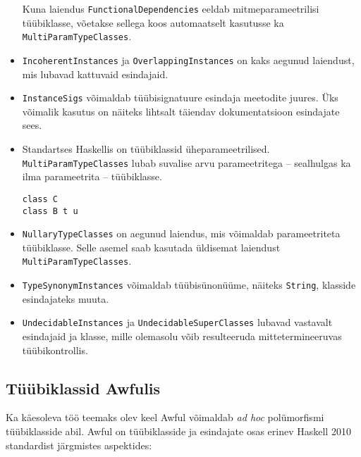 \documentclass[12pt]{article}
\begin{document}
\begin{itemize}
            Kuna laiendus \verb!FunctionalDependencies! eeldab mitmeparameetrilisi tüübiklasse, võetakse sellega koos automaatselt kasutusse ka \verb!MultiParamTypeClasses!.
          \item
            \verb!IncoherentInstances! ja \verb!OverlappingInstances! on kaks aegunud laiendust, mis lubavad kattuvaid esindajaid.
          \item
            \verb!InstanceSigs! võimaldab tüübisignatuure esindaja meetodite juures. Üks võimalik kasutus on näiteks lihtsalt täiendav dokumentatsioon esindajate sees.
          \item
            Standartses Haskellis on tüübiklassid üheparameetrilised. \verb!MultiParamTypeClasses! lubab suvalise arvu parameetritega -- sealhulgas ka ilma parameetrita -- tüübiklasse.

            \begin{verbatim}
class C
class B t u\end{verbatim}
          \item
            \verb!NullaryTypeClasses! on aegunud laiendus, mis võimaldab parameetriteta tüübiklasse. Selle asemel saab kasutada üldisemat laiendust \verb!MultiParamTypeClasses!.
          \item
            \verb!TypeSynonymInstances! võimaldab tüübisünonüüme, näiteks \verb!String!, klasside esindajateks muuta.
          \item
            \verb!UndecidableInstances! ja \verb!UndecidableSuperClasses! lubavad vastavalt esindajaid ja klasse, mille olemasolu võib resulteeruda mittetermineeruvas tüübikontrollis.
        \end{itemize}
    \subsection{Tüübiklassid Awfulis}
      Ka käesoleva töö teemaks olev keel Awful võimaldab \textit{ad hoc} polümorfismi tüübiklasside abil. Awful on tüübiklasside ja esindajate osas erinev Haskell 2010 standardist järgmistes aspektides:
\end{document}
